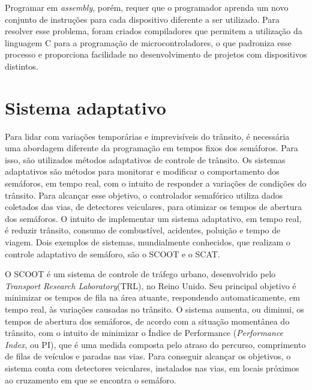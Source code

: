 Programar em \textit{assembly}, porém, requer que o programador aprenda um novo conjunto de instruções para cada dispositivo diferente a ser utilizado. Para resolver esse problema, foram criados compiladores que permitem a utilização da linguagem C para a programação de microcontroladores, o que padroniza esse processo e proporciona facilidade no desenvolvimento de projetos com dispositivos distintos.

\section{Sistema adaptativo}

Para lidar com variações temporárias e imprevisíveis do trânsito, é necessária uma abordagem diferente da programação em tempos fixos dos semáforos. Para isso, são utilizados métodos adaptativos de controle de trânsito.
Os sistemas adaptativos são métodos para monitorar e modificar o comportamento dos semáforos, em tempo real, com o intuito de responder a variações de condições do trânsito. Para alcançar esse objetivo, o controlador semafórico utiliza dados coletados das vias, de detectores veiculares, para otimizar os tempos de abertura dos semáforos.
O intuito de implementar um sistema adaptativo, em tempo real, é reduzir trânsito, consumo de combustível, acidentes, poluição e tempo de viagem.
Dois exemplos de sistemas, mundialmente conhecidos, que realizam o controle adaptativo de semáforo, são o SCOOT e o SCAT.

O SCOOT é um sistema de controle de tráfego urbano, desenvolvido pelo \textit{Transport Research Laboratory}(TRL), no Reino Unido. Seu principal objetivo é minimizar os tempos de fila na área atuante, respondendo automaticamente, em tempo real, às variações causadas no trânsito. O sistema aumenta, ou diminui, os tempos de abertura dos semáforos, de acordo com a situação momentânea do trânsito, com o intuito de minimizar o Índice de Performance (\textit{Performance Index}, ou PI), que é uma medida composta pelo atraso do percurso, comprimento de filas de veículos e paradas nas vias. Para conseguir alcançar os objetivos, o sistema conta com detectores veiculares, instalados nas vias, em locais próximos ao cruzamento em que se encontra o semáforo.

